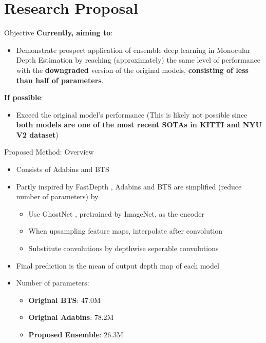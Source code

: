 \documentclass[10pt]{beamer}
\begin{document}
\section{Research Proposal}
\begin{frame}{Objective}
    \textbf{Currently, aiming to}:
    \begin{itemize}
        \item Demonstrate prospect application of ensemble deep learning in Monocular Depth Estimation by reaching (approximately) the same level of performance with the \textbf{downgraded} version of the original models, \textbf{consisting of less than half of parameters}.
    \end{itemize}
    
    \vspace{0.3cm} 
    
    \textbf{If possible}:
    \begin{itemize}
        \item Exceed the original model's performance (This is likely not possible since \textbf{both models are one of the most recent SOTAs in KITTI and NYU V2 dataset})
    \end{itemize}
    
\end{frame}

\begin{frame}{Proposed Method: Overview}
    \begin{itemize}
        \item Consists of Adabins \cite{adabins} and BTS \cite{bts}
        \item Partly inspired by FastDepth \cite{fastdepth}, Adabins and BTS are simplified (reduce number of parameters) by
            \begin{itemize}
                \item Use GhostNet \cite{ghostnet}, pretrained by ImageNet, as the encoder
                \item When upsampling feature maps, interpolate after convolution
                \item Substitute convolutions by depthwise seperable convolutions
            \end{itemize}
        \item Final prediction is the mean of output depth map of each model
        \item Number of parameters:
            \begin{itemize}
                \item \textbf{Original BTS}: 47.0M
                \item \textbf{Original Adabins}: 78.2M
                \item \textbf{Proposed Ensemble}: 26.3M
            \end{itemize}
    \end{itemize}
\end{frame}
\end{document}
